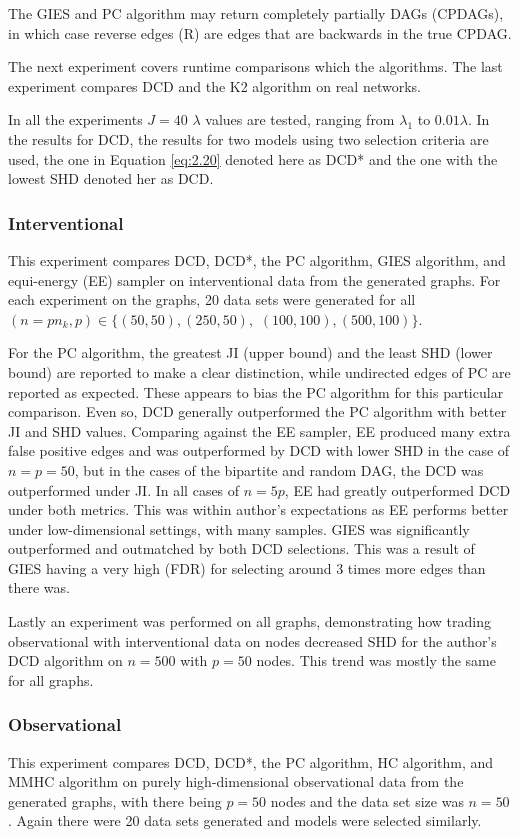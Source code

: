 \documentclass[twoside,11pt]{article}
\begin{document}
The GIES and PC algorithm may return completely partially DAGs (CPDAGs), in which case reverse edges (R) are edges that are backwards in the true CPDAG.

The next experiment covers runtime comparisons which the algorithms. The last experiment compares DCD and the K2 algorithm on real networks.

In all the experiments $J=40$ $\lambda$ values are tested, ranging from $\lambda_1$ to $0.01\lambda$. In the results for DCD, the results for two models using two selection criteria are used, the one in Equation \eqref{eq:2.20} denoted here as DCD* and the one with the lowest SHD denoted her as DCD. 

\subsubsection{Interventional}
This experiment compares DCD, DCD*, the PC algorithm, GIES algorithm, and equi-energy (EE) sampler on interventional data from the generated graphs. For each experiment on the graphs, 20 data sets were generated for all $(n=pn_k,p)\in\{(50,50),(250,50),$ $(100,100),(500,100)\}$.

For the PC algorithm, the greatest JI (upper bound) and the least SHD (lower bound) are reported to make a clear distinction, while undirected edges of PC are reported as expected. These appears to bias the PC algorithm for this particular comparison. Even so, DCD generally outperformed the PC algorithm with better JI and SHD values. Comparing against the EE sampler, EE produced many extra false positive edges and was outperformed by DCD with lower SHD in the case of $n=p=50$, but in the cases of the bipartite and random DAG, the DCD was outperformed under JI. In all cases of $n=5p$, EE had greatly outperformed DCD under both metrics. This was within author's expectations as EE performs better under low-dimensional settings, with many samples. GIES was significantly outperformed and outmatched by both DCD selections. This was a result of GIES having a very high (FDR) for selecting around 3 times more edges than there was.

Lastly an experiment was performed on all graphs, demonstrating how trading observational with interventional data on nodes decreased SHD for the author's DCD algorithm on $n=500$ with $p=50$ nodes. This trend was mostly the same for all graphs.


\subsubsection{Observational}
This experiment compares DCD, DCD*, the PC algorithm, HC algorithm, and MMHC algorithm on purely high-dimensional observational data from the generated graphs, with there being $p=50$ nodes and the data set size was $n=50$. Again there were 20 data sets generated and models were selected similarly.
\end{document}
